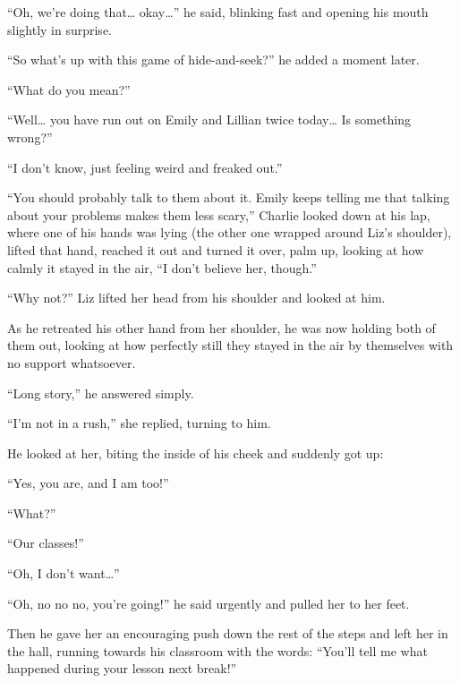 “Oh, we're doing that… okay…” he said, blinking fast and opening his mouth slightly in surprise.

“So what's up with this game of hide-and-seek?” he added a moment later.

“What do you mean?”

“Well… you have run out on Emily and Lillian twice today… Is something wrong?”

“I don't know, just feeling weird and freaked out.”

“You should probably talk to them about it. Emily keeps telling me that talking about your problems makes them less scary,” Charlie looked down at his lap, where one of his hands was lying (the other one wrapped around Liz's shoulder), lifted that hand, reached it out and turned it over, palm up, looking at how calmly it stayed in the air, “I don't believe her, though.”

“Why not?” Liz lifted her head from his shoulder and looked at him.

As he retreated his other hand from her shoulder, he was now holding both of them out, looking at how perfectly still they stayed in the air by themselves with no support whatsoever.

“Long story,” he answered simply.

“I'm not in a rush,” she replied, turning to him.

He looked at her, biting the inside of his cheek and suddenly got up:

“Yes, you are, and I am too!”

“What?”

“Our classes!”

“Oh, I don't want…”

“Oh, no no no, you're going!” he said urgently and pulled her to her feet.

Then he gave her an encouraging push down the rest of the steps and left her in the hall, running towards his classroom with the words: “You'll tell me what happened during your lesson next break!”